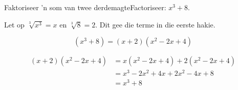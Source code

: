 % 
% 

\begin{wex}{Faktoriseer 'n som van twee derdemagte}{Factoriseer: $x^{3}+8$.}
{
Let op $\sqrt[3]{x^{3}} = x$ en $\sqrt[3]{8} = 2$. Dit gee die terme in die eerste hakie.

\begin{equation*}
  (x^{3} +8) = (x+2)(x^{2}-2x+4)
\end{equation*}

\begin{align*}
  (x+2)(x^{2}-2x+4) &= x(x^{2}-2x+4)+2(x^{2}-2x+4)\\
		   &=x^{3}-2x^{2}+4x+2x^{2}-4x+8\\
		   &=x^{3}+8\\
\end{align*}
}
\end{wex}

